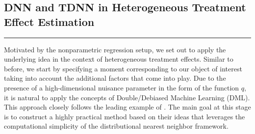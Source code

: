 \subsection{DNN and TDNN in Heterogeneous Treatment Effect Estimation}
\hrule
Motivated by the nonparametric regression setup, we set out to apply the underlying idea in the context of heterogeneous treatment effects.
Similar to before, we start by specifying a moment corresponding to our object of interest taking into account the additional factors that come into play.
Due to the presence of a high-dimensional nuisance parameter in the form of the function $q$, it is natural to apply the concepts of Double/Debiased Machine Learning (DML).
This approach closely follows the leading example of \citet{ritzwoller_uniform_2024}.
The main goal at this stage is to construct a highly practical method based on their ideas that leverages the computational simplicity of the distributional nearest neighbor framework.\\

